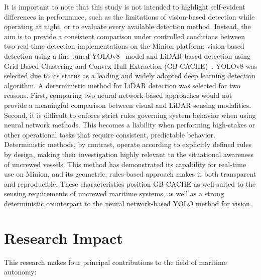 It is important to note that this study is not intended to highlight self-evident differences in performance, such as the limitations of vision-based detection while operating at night, or to evaluate every available detection method.
Instead, the aim is to provide a consistent comparison under controlled conditions between two real-time detection implementations on the Minion platform: vision-based detection using a fine-tuned YOLOv8~\cite{redmon2016} model and LiDAR-based detection using Grid-Based Clustering and Convex Hull Extraction (GB-CACHE)~\cite{coyleE}.
YOLOv8 was selected due to its status as a leading and widely adopted deep learning detection algorithm. 
A deterministic method for LiDAR detection was selected for two reasons. 
First, comparing two neural network-based approaches would not provide a meaningful comparison between visual and LiDAR sensing modalities. 
Second, it is difficult to enforce strict rules governing system behavior when using neural network methods. 
This becomes a liability when performing high-stakes or other operational tasks that require consistent, predictable behavior.
Deterministic methods, by contrast, operate according to explicitly defined rules by design, making their investigation highly relevant to the situational awareness of uncrewed vessels.
This method has demonstrated its capability for real-time use on Minion, and its geometric, rules-based approach makes it both transparent and reproducible. 
These characteristics position GB-CACHE as well-suited to the sensing requirements of uncrewed maritime systems, as well as a strong deterministic counterpart to the neural network-based YOLO method for vision.




\section{Research Impact}
This research makes four principal contributions to the field of maritime autonomy:

